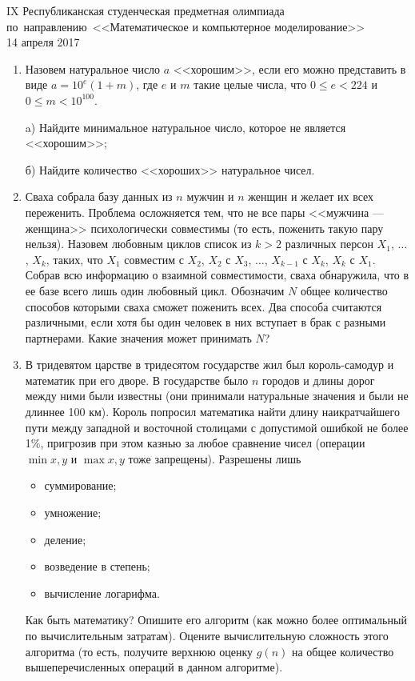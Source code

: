 \documentclass[11pt, a5paper]{article}
\newcommand{\head}[4]
{
	\fancyhf{}
	\pagestyle{fancy}
	\chead{#3, #4}

	\begin{center}
	\begin{large}
	#1 \\
	#2 \\
	\end{large}
	\end{center}

}
\begin{document}
\head{IX Республиканская студенческая предметная олимпиада по~направлению~<<Математическое и компьютерное моделирование>>}{14 апреля 2017}{Назарбаев Университет}{г. Астана}

\begin{enumerate}
\item Назовем натуральное число $a$ <<хорошим>>, если его можно представить в виде $a = 10^e (1+m)$, где $e$ и $m$ такие целые числа, что $0 \leqslant e < 224$ и $0 \leqslant m < 10^{100}$.

a) Найдите минимальное натуральное число, которое не является <<хорошим>>;

б) Найдите количество <<хороших>> натуральное чисел.

\item Сваха собрала базу данных из $n$ мужчин и $n$ женщин и желает их всех
переженить. Проблема осложняется тем, что не все пары <<мужчина --- женщина>> психологически совместимы (то есть, поженить такую пару нельзя). Назовем любовным циклов список из $k > 2$ различных персон $X_1$, $\dots$, $X_k$, таких, что $X_1$ совместим с $X_2$, $X_2$ с $X_3$, $\dots$, $X_{k-1}$ с $X_k$, $X_k$ с $X_1$. Собрав всю информацию о взаимной совместимости, сваха обнаружила, что в ее базе всего лишь один любовный цикл. Обозначим $N$ общее количество способов которыми сваха сможет поженить всех. Два способа считаются различными, если хотя бы один человек в них вступает в брак с разными партнерами. Какие значения может принимать $N$?

\item В тридевятом царстве в тридесятом государстве жил был король-самодур и математик при его дворе. В государстве было $n$ городов и длины дорог между ними были известны (они принимали натуральные значения и были не длиннее 100 км). Король попросил математика найти длину наикратчайшего пути между западной и восточной столицами с допустимой ошибкой не более 1\%, пригрозив при этом казнью за любое сравнение чисел (операции $\min{x, y}$ и $\max{x, y}$ тоже запрещены). Разрешены лишь 
\begin{itemize}
\item суммирование;
\item умножение;
\item деление;
\item возведение в степень;
\item вычисление логарифма.
\end{itemize}
Как быть математику? Опишите его алгоритм (как можно более оптимальный по вычислительным затратам). Оцените вычислительную сложность этого алгоритма (то есть, получите верхнюю оценку $g(n)$ на общее количество вышеперечисленных операций в данном алгоритме).


\end{enumerate}
\end{document}
